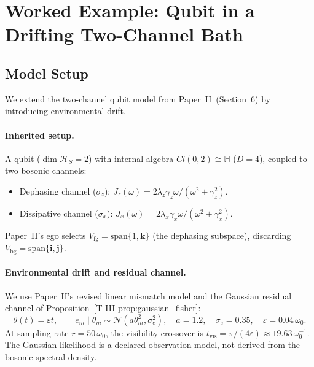 \documentclass[12pt,a4paper,openany]{book}
\begin{document}
\section{Worked Example: Qubit in a Drifting
Two-Channel Bath}
\label{T-III-sec:example}

\subsection{Model Setup}
\label{T-III-subsec:model_III}

We extend the two-channel qubit model from
Paper~II~(Section~6) by introducing environmental drift.

\paragraph{Inherited setup.}
A qubit ($\dim\mathcal{H}_S = 2$) with internal algebra
$Cl(0,2) \cong \mathbb{H}$ ($D = 4$), coupled to two
bosonic channels:
\begin{itemize}
\item Dephasing channel ($\sigma_z$):
  $J_z(\omega) = 2\lambda_z\gamma_z\omega/
  (\omega^2 + \gamma_z^2)$.
\item Dissipative channel ($\sigma_x$):
  $J_x(\omega) = 2\lambda_x\gamma_x\omega/
  (\omega^2 + \gamma_x^2)$.
\end{itemize}
Paper~II's ego selects $V_{\mathrm{fg}}
= \mathrm{span}\{1,\mathbf{k}\}$ (the dephasing subspace),
discarding $V_{\mathrm{bg}}
= \mathrm{span}\{\mathbf{i},\mathbf{j}\}$.

\paragraph{Environmental drift and residual channel.}
We use Paper~II's revised linear mismatch model and the Gaussian
residual channel of Proposition~\ref{T-III-prop:gaussian_fisher}:
\begin{equation}
\label{T-III-eq:drift_model}
\theta(t)=\varepsilon t,\qquad
e_m\mid\theta_m\sim\mathcal N(a\theta_m^2,\sigma_e^2),
\quad a=1.2,\quad\sigma_e=0.35,\quad
\varepsilon=0.04\,\omega_0.
\end{equation}
At sampling rate $r=50\,\omega_0$, the visibility crossover is
$t_{\mathrm{vis}}=\pi/(4\varepsilon)\approx19.63\,\omega_0^{-1}$.
The Gaussian likelihood is a declared observation model, not derived
from the bosonic spectral density.
\end{document}
